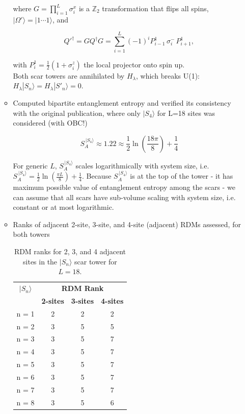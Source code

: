 \documentclass[11pt]{article}
\begin{document}
\begin{itemize}
\begin{itemize}
	\noindent where $G = \prod_{i=1}^L \sigma_i^x$ is a $\mathbb{Z}_2$ transformation that flips all spins, 
	$|\Omega'\rangle = |1 \cdots 1\rangle$, and
	
	\begin{equation}
	Q'^\dagger = G Q^\dagger G = \sum_{i = 1}^{L} (-1)^i P^1_{i-1} \, \sigma^-_i \, P^1_{i+1},
	\end{equation}
	
	\noindent with $P^1_i = \frac{1}{2}(1 + \sigma^z_i)$ the local projector onto spin up.\\
	Both scar towers are annihilated by $H_{\lambda}$, which breaks U(1): $H_{\lambda} |S_n\rangle = H_{\lambda} |S'_n\rangle = 0$.
        \item Computed bipartite entanglement entropy and verified its consistency with the original publication, where only $|S_4\rangle$ for L=18 sites was considered (with OBC!)
        
        \begin{equation}
        S^{\,|S_4\rangle}_A \approx 1.22 \approx \frac{1}{2} \ln \left(\frac{18 \pi}{8}\right) + \frac{1}{4}
        \end{equation}
        
        For generic $L$, $S^{\,|S_4\rangle}_A$ scales logarithmically with system size, i.e. $S^{\,|S_4\rangle}_A = \frac{1}{2} \ln \left(\frac{\pi L}{8}\right) + \frac{1}{4}$. Because $S^{\,|S_4\rangle}_A$ is at the top of the tower - it has maximum possible 				value of entanglement entropy among the scars - we can assume that all scars have sub-volume scaling with system size, i.e. constant or at most logarithmic.
        
        \item Ranks of adjacent 2-site, 3-site, and 4-site (adjacent) RDMs assessed, for both towers
        
        \begin{table}[H]
	\centering
	\begin{tabular}{|c|ccc|}
	\hline
	\textbf{$|S_n\rangle$} & \multicolumn{3}{c|}{\textbf{RDM Rank}} \\
	\cline{2-4}
	& \textbf{2-sites} & \textbf{3-sites} & \textbf{4-sites} \\
	\hline
	 n = 1 & 2 & 2 & 2 \\
	 n = 2 & 3 & 5 & 5 \\
	 n = 3 & 3 & 5 & 7 \\
	 n = 4 & 3 & 5 & 7 \\  
	 n = 5 & 3 & 5 & 7 \\
	 n = 6 & 3 & 5 & 7 \\
	 n = 7 & 3 & 5 & 7 \\
	 n = 8 & 3 & 5 & 6 \\
	\hline
	\end{tabular}
	\caption{RDM ranks for 2, 3, and 4 adjacent sites in the $|S_n\rangle$ scar tower for $L=18$.}
	\label{tab:ranks1}
	\end{table}


\end{itemize}
\end{itemize}
\end{document}
